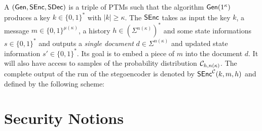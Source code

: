 A 
$(\operatorname{\mathsf{Gen}},\operatorname{\mathsf{SEnc}},\operatorname{\mathsf{SDec}})$ is a triple of \acp{PTM} such that the algorithm
$\operatorname{\mathsf{Gen}}(1^{\kappa})$ produces a key $k\in \{0,1\}^{*}$ with $|k|\geq
\kappa$. The  $\operatorname{\mathsf{SEnc}}$ takes as input the key $k$, a
message $m\in \{0,1\}^{\mu(\kappa)}$, a history $h\in
\left(\Sigma^{n(\kappa)}\right)^{*}$ and some state informations $s\in
\{0,1\}^{*}$ and outputs a \emph{single document} $d\in
\Sigma^{n(\kappa)}$ and updated state information $s'\in
\{0,1\}^{*}$. Its goal is to embed a piece of $m$ into the document
$d$. It will also have access to samples of the probability distribution
$\mathcal{C}_{h,n(\kappa)}$. The complete output of the run of the
stegoencoder is denoted by $\operatorname{\mathsf{SEnc}}^{\mathcal{C}}(k,m,h)$ and defined by the
following scheme:



\section{Security Notions}


